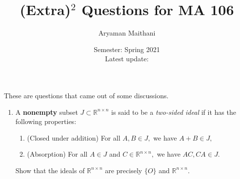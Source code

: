 \documentclass[12pt]{article}
\title{(Extra)\texorpdfstring{$^2$}{2} Questions for MA 106}
\author{Aryaman Maithani}%
\date{Semester: Spring 2021\\ Latest update: \DTMnow}
\begin{document}
\maketitle

These are questions that came out of some discussions.

\begin{enumerate}
	\item A \textbf{nonempty} subset $J \subset \mathbb{R}^{n \times n}$ is said to be a \emph{two-sided ideal} if it has the following properties:
	\begin{enumerate}
		\item (Closed under addition) For all $A, B \in J,$ we have $A + B \in J,$
		\item (Absorption) For all $A \in J$ and $C \in \mathbb{R}^{n \times n},$ we have $AC, CA \in J.$
	\end{enumerate}
	Show that the ideals of $\mathbb{R}^{n \times n}$ are precisely $\{O\}$ and $\mathbb{R}^{n \times n}.$
\end{enumerate}
\end{document}
